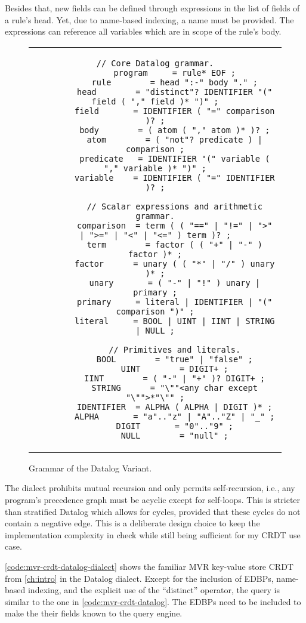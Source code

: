 Besides that, new fields can be defined through expressions in the list of fields
of a rule's head.
Yet, due to name-based indexing, a name must be provided.
The expressions can reference all variables which are in scope of the rule's body.

\begin{figure}[htpb]
	\centering
	\begin{tabular}{c}
		\begin{lstlisting}[keepspaces]
		// Core Datalog grammar.
		program     = rule* EOF ;
        rule        = head ":-" body "." ;
        head        = "distinct"? IDENTIFIER "(" field ( "," field )* ")" ;
        field       = IDENTIFIER ( "=" comparison )? ;
        body        = ( atom ( "," atom )* )? ;
        atom        = ( "not"? predicate ) | comparison ;
        predicate   = IDENTIFIER "(" variable ( "," variable )* ")" ;
        variable    = IDENTIFIER ( "=" IDENTIFIER )? ;

        // Scalar expressions and arithmetic grammar.
		comparison  = term ( ( "==" | "!=" | ">" | ">=" | "<" | "<=" ) term )? ;
		term        = factor ( ( "+" | "-" ) factor )* ;
		factor      = unary ( ( "*" | "/" ) unary )* ;
		unary       = ( "-" | "!" ) unary | primary ;
		primary     = literal | IDENTIFIER | "(" comparison ")" ;
		literal     = BOOL | UINT | IINT | STRING | NULL ;

		// Primitives and literals.
		BOOL        = "true" | "false" ;
		UINT        = DIGIT+ ;
		IINT        = ( "-" | "+" )? DIGIT+ ;
		STRING      = "\""<any char except "\"">*"\"" ;
		IDENTIFIER  = ALPHA ( ALPHA | DIGIT )* ;
		ALPHA       = "a".."z" | "A".."Z" | "_" ;
		DIGIT       = "0".."9" ;
		NULL        = "null" ;
        \end{lstlisting}
	\end{tabular}
	\caption{Grammar of the Datalog Variant.}\label{code:datalog-grammar}
\end{figure}

The dialect prohibits mutual recursion and only permits self-recursion, i.e.,
any program's precedence graph must be acyclic except for self-loops.
This is stricter than stratified Datalog which allows for cycles,
provided that these cycles do not contain a negative edge.
This is a deliberate design choice to keep the implementation complexity in check
while still being sufficient for my \ac{CRDT} use case.

\ref{code:mvr-crdt-datalog-dialect} shows the familiar \ac{MVR} key-value store
\ac{CRDT} from \ref{ch:intro} in the Datalog dialect.
Except for the inclusion of \acp{EDBP}, name-based indexing, and the explicit
use of the ``distinct'' operator, the query is similar to the one
in \ref{code:mvr-crdt-datalog}.
The \acp{EDBP} need to be included to make the their fields known to the
query engine.


